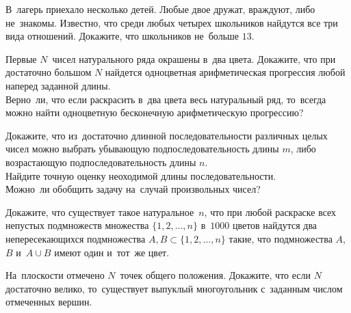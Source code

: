 


\begin{problems}


\item
В~лагерь приехало несколько детей.
Любые двое дружат, враждуют, либо не~знакомы.
Известно, что среди любых четырех школьников найдутся все три вида отношений.
Докажите, что школьников не~больше $13$.


\item
\subproblem{}
Первые $N$~чисел натурального ряда окрашены в~два цвета.
Докажите, что при достаточно большом $N$ найдется одноцветная арифметическая
прогрессия любой наперед заданной длины.
\\
\subproblem
Верно~ли, что если раскрасить в~два цвета весь натуральный ряд, то~всегда можно
найти одноцветную бесконечную арифметическую прогрессию?

\item
\subproblem
Докажите, что из~достаточно длинной последовательности различных целых
чисел можно выбрать убывающую подпоследовательность длины $m$, либо
возрастающую подпоследовательность длины $n$.
\\
\subproblem
Найдите точную оценку неоходимой длины последовательности.
\\
\subproblem
Можно~ли обобщить задачу на~случай произвольных чисел?

\item
Докажите, что существует такое натуральное~$n$, что при любой раскраске всех
непустых подмножеств множества $\{ 1, 2, \ldots, n \}$ в~$1000$ цветов найдутся
два непересекающихся подмножества $A, B \subset \{1, 2, \ldots, n\}$ такие, что
подмножества $A$, $B$ и~$A \cup B$ имеют один и~тот~же цвет.

\item
На~плоскости отмечено $N$~точек общего положения.
Докажите, что если $N$ достаточно велико, то~существует выпуклый многоугольник
с~заданным числом отмеченных вершин.

\end{problems}

